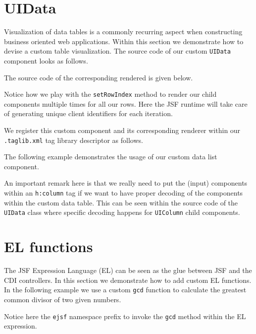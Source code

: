 \section{UIData}
Visualization of data tables is a commonly recurring aspect when constructing business oriented web applications.
Within this section we demonstrate how to devise a custom table visualization.
The source code of our custom \texttt{UIData} component looks as follows.


The source code of the corresponding rendered is given below.

Notice how we play with the \texttt{setRowIndex} method to render our child components multiple times for all our rows.
Here the JSF runtime will take care of generating unique client identifiers for each iteration.

We register this custom component and its corresponding renderer within our \texttt{.taglib\allowbreak .xml} tag library descriptor as follows.


The following example demonstrates the usage of our custom data list component.

An important remark here is that we really need to put the (input) components within an \texttt{h:column} tag if we want to have proper decoding of the components within the custom data table.
This can be seen within the source code of the \texttt{UIData} class where specific decoding happens for \texttt{UIColumn} child components.


\section{EL functions}
The JSF Expression Language (EL) can be seen as the glue between JSF and the CDI controllers.
In this section we demonstrate how to add custom EL functions.
In the following example we use a custom \texttt{gcd} function to calculate the greatest common divisor of two given numbers.

Notice here the \texttt{ejsf} namespace prefix to invoke the \texttt{gcd} method within the EL expression.

